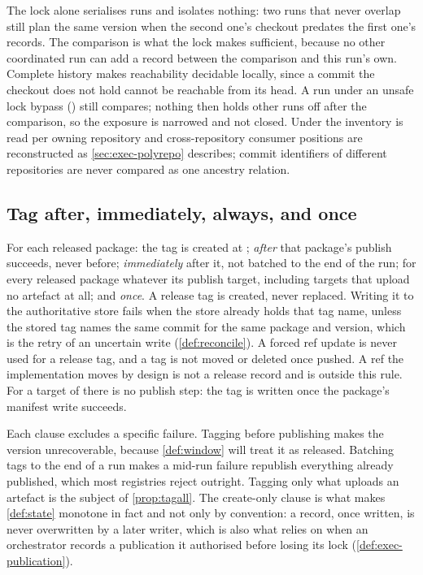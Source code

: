 The lock alone serialises runs and isolates nothing: two runs that never
overlap still plan the same version when the second one's checkout predates
the first one's records. The comparison is what the lock makes sufficient,
because no other coordinated run can add a record between the comparison and
this run's own. Complete history makes reachability decidable locally, since a
commit the checkout does not hold cannot be reachable from its head. A run
under an unsafe lock bypass () still compares; nothing then holds
other runs off after the comparison, so the exposure is narrowed and not
closed. Under  the inventory is read per owning repository and
cross-repository consumer positions are reconstructed as
\cref{sec:exec-polyrepo} describes; commit identifiers of different
repositories are never compared as one ancestry relation.

\subsection{Tag after, immediately, always, and once}

\begin{definition}
\label{def:tagging}
For each released package: the tag is created at \Head{}; \emph{after} that
package's publish succeeds, never before; \emph{immediately} after it, not
batched to the end of the run; for every released package whatever its
publish target, including targets that upload no artefact at all; and
\emph{once}. A release tag is created, never replaced. Writing it to the
authoritative store fails when the store already holds that tag name, unless
the stored tag names the same commit for the same package and version, which
is the retry of an uncertain write (\cref{def:reconcile}). A forced ref update
is never used for a release tag, and a tag is not moved or deleted once
pushed. A ref the implementation moves by design is not a release record and
is outside this rule. For a target of  there is no publish step:
the tag is written once the package's manifest write succeeds.
\end{definition}

Each clause excludes a specific failure. Tagging before publishing makes the
version unrecoverable, because \cref{def:window} will treat it as released.
Batching tags to the end of a run makes a mid-run failure republish everything
already published, which most registries reject outright. Tagging only what
uploads an artefact is the subject of \cref{prop:tagall}. The create-only
clause is what makes \cref{def:state} monotone in fact and not only by
convention: a record, once written, is never overwritten by a later writer,
which is also what  relies on when an orchestrator records a
publication it authorised before losing its lock
(\cref{def:exec-publication}).

